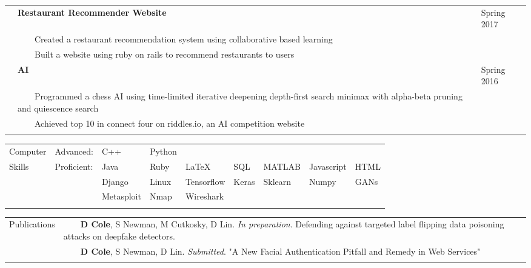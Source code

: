 \documentclass[10.5pt, arial]{article}
\newcommand{\tabitem}{~~\llap{\textbullet}~~}
\begin{document}
\begin{tabular}{p{1.5cm} p{13.2cm} l}
                & \textbf{Restaurant Recommender Website}                       & Spring 2017             \\
                & \tabitem Created a restaurant recommendation system using collaborative based learning    &   \\
                & \tabitem Built a website using ruby on rails to recommend restaurants to users            &   \\

                & \textbf{AI}                                             & Spring 2016   \\
                & \tabitem Programmed a chess AI using time-limited iterative deepening depth-first search minimax with alpha-beta pruning and quiescence search & \\
                & \tabitem Achieved top 10 in connect four on riddles.io, an AI competition website & \\ 
\\
\end{tabular}


\begin{tabular}{p{1.5cm} l l l l l l l l}
Computer	& Advanced: 	& C++ 		& Python 	& 			& 			& 			& 				&       \\
Skills		& Proficient:	& Java 		& Ruby 		& \LaTeX 	& SQL 		& MATLAB   	& Javascript	& HTML  \\
			&			 	& Django 	& Linux 	& Tensorflow& Keras     & Sklearn	& Numpy	        & GANs  \\
            &               & Metasploit& Nmap      & Wireshark &           &           &               &       \\
\\
\end{tabular}


\begin{tabular}{p{1.5cm} p{16.5cm}}
    Publications    & \tabitem \textbf{D Cole}, S Newman, M Cutkosky, D Lin. \textit{In preparation}. Defending against targeted label flipping data poisoning attacks on deepfake detectors. \\
                    & \tabitem \textbf{D Cole}, S Newman, D Lin. \textit{Submitted}. "A New Facial Authentication Pitfall and Remedy in Web Services" \\ \\
\end{tabular}
\end{document}
